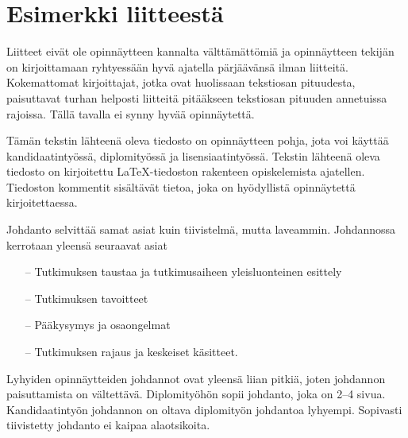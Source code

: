 \documentclass[english,12pt,a4paper,pdftex,sci,utf8]{aaltothesis}
\begin{document}

\thesisbibliography
\printbibliography

\clearpage

\thesisappendix

\section{Esimerkki liitteest\"a\label{LiiteA}}

Liitteet eiv\"at ole opinn\"aytteen kannalta v\"altt\"am\"att\"omi\"a ja
opinn\"aytteen tekij\"an on
kirjoittamaan ryhtyess\"a\"an hyv\"a ajatella p\"arj\"a\"av\"ans\"a ilman liitteit\"a.
Kokemattomat kirjoittajat, jotka ovat huolissaan
tekstiosan pituudesta, paisuttavat turhan
helposti liitteit\"a pit\"a\"akseen tekstiosan pituuden annetuissa rajoissa.
T\"all\"a tavalla ei synny hyv\"a\"a opinn\"aytett\"a.


T\"am\"an tekstin l\"ahteen\"a oleva tiedosto on opinn\"aytteen
pohja, jota voi k\"aytt\"a\"a kandidaatinty\"oss\"a, diplomity\"oss\"a ja
lisensiaatinty\"oss\"a. Tekstin
l\"ahteen\"a oleva tiedosto on kirjoitettu  \LaTeX-tiedoston rakenteen
opiskelemista ajatellen. Tiedoston kommentit sis\"alt\"av\"at
tietoa, joka on hy\"odyllist\"a opinn\"aytett\"a kirjoitettaessa.

Johdanto selvitt\"a\"a samat asiat kuin tiivistelm\"a, mutta
laveammin. Johdannossa kerrotaan yleens\"a seuraavat asiat

\begin{itemize}
\item[--]Tutkimuksen taustaa ja tutkimusaiheen yleisluonteinen esittely
\item[--]Tutkimuksen tavoitteet
\item[--]P\"a\"akysymys ja osaongelmat
\item[--]Tutkimuksen rajaus ja keskeiset k\"asitteet.
\end{itemize}

Lyhyiden opinn\"aytteiden johdannot ovat yleens\"a liian pitki\"a, joten
johdannon paisuttamista on v\"altett\"av\"a. Diplomity\"oh\"on sopii johdanto,
joka on 2--4 sivua. %
Kandidaatinty\"on johdannon on oltava diplomity\"on
johdantoa lyhyempi. Sopivasti tiivistetty johdanto ei kaipaa alaotsikoita.
\end{document}
